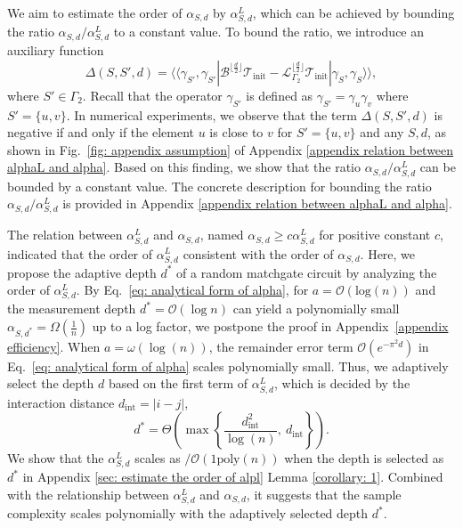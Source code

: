 \documentclass[journal=jctcce,a4paper,manuscript=article]{achemso}
\newcommand{\supket}[1]{|#1 \rangle\rangle}
\newcommand{\supbra}[1]{\langle\langle #1 |}
\newcommand{\cbra}[1]{\{ #1 \}}
\newcommand{\pbra}[1]{\left( #1 \right)}
\newcommand{\Tcal}{\mathcal{T}}
\begin{document}
We aim to estimate the order of $\alpha_{S,d}$ by $\alpha_{S,d}^L$, which can
be achieved by bounding the ratio $\alpha_{S,d} /\alpha_{S,d}^L$ to a constant
value. To bound the ratio, we introduce an auxiliary function
\begin{equation}
  \label{eq: def del}
  \Delta(S,S',d) = \supbra{\gamma_{S' }, \gamma_{S'}}
  \mathcal{B}^{\lfloor \frac{d}{2}\rfloor} \Tcal_\text{init} -  \mathcal{L}_{\Gamma_2}^{\lfloor \frac{d}{2}\rfloor} \Tcal_\text{init} \supket{\gamma_S, \gamma_S},
\end{equation}
where $S'\in\Gamma_2$.
Recall that the operator $\gamma_{S'}$ is defined as $\gamma_{S'} = \gamma_{u} \gamma_{v}$ where $S' = \cbra{u,v}$.
In numerical experiments, we observe that the term $\Delta(S, S',d)$ is negative if and only if the element $u$ is close to $v$ for $S'=\cbra{u,v}$ and any $S,d$, as shown in Fig.~\ref{fig: appendix assumption} of Appendix \ref{appendix relation between alphaL and alpha}. Based on this finding, we show that the ratio $\alpha_{S,d} /\alpha_{S,d}^L$ can be bounded by a constant value. The concrete description for bounding the ratio $\alpha_{S,d} /\alpha_{S,d}^L$ is provided in Appendix \ref{appendix relation between alphaL and alpha}.

The relation between $\alpha^L_{S,d}$ and $\alpha_{S,d}$, named
$\alpha_{S,d}\geq c\alpha^L_{S,d}$ for positive constant $c$, indicated that
the order of $\alpha_{S,d}^L$ consistent with the order of $\alpha_{S,d}$.
Here, we propose the adaptive depth $d^\ast$ of a random matchgate circuit by
analyzing the order of $\alpha^L_{S,d}$. By Eq.~\eqref{eq: analytical form of
  alpha}, for $ a = \mathcal{O}(\mathrm{log}(n)) $ and the measurement depth $
  d^\ast = \mathcal{O} (\log n)$ can yield a polynomially small $ \alpha_{S,d^*}
  = \Omega\left(\frac{1}{n} \right)$ up to a log factor, we postpone the proof in
Appendix~\ref{appendix efficiency}. {When $a=\omega\pbra{\log(n)}$, the
remainder error term $\mathcal{O}(e^{-\pi^2 d})$ in Eq.~\eqref{eq: analytical
  form of alpha} scales polynomially small. } Thus, we adaptively select the
depth $d$ based on the first term of $\alpha_{S,d}^L$, which is decided by the
interaction distance $d_{\text{int}} = |i-j|$,
\begin{equation}
  d^\ast = \Theta\left( \max\left\{\frac{d_{\text{int}}^2}{\log(n)}, ~d_{\text{int}}  \right\} \right).
\end{equation}
We show that the $\alpha_{S,d}^L$ scales as $/\mathcal{O}(1\text{poly}(n))$ when the depth is selected as $d^\ast$ in Appendix \ref{sec: estimate the order of alpl} Lemma \ref{corollary: 1}. Combined with the relationship between $\alpha^L_{S,d}$ and $\alpha_{S,d}$, it suggests that the sample complexity scales polynomially with the adaptively selected depth $d^\ast$.
\end{document}
